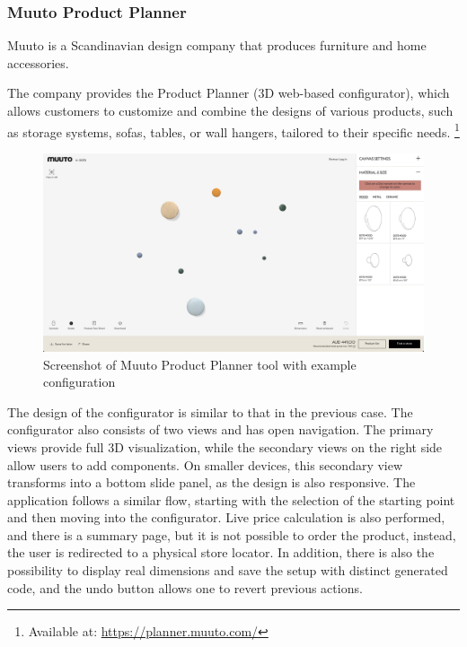 \subsubsection{Muuto Product Planner}

Muuto is a Scandinavian design company that produces furniture and home accessories. \cite{Muuto}

The company provides the Product Planner (3D web-based configurator), which allows customers to customize and combine the designs of various products, such as storage systems, sofas, tables, or wall hangers, tailored to their specific needs. \footnote{Available at: \url{https://planner.muuto.com/}}

\begin{figure}[h]
\centering
\includegraphics[width=\textwidth]{images/analysis_muuto-product-planner.png}
\caption{Screenshot of Muuto Product Planner tool with example configuration}
\end{figure}

The design of the configurator is similar to that in the previous case. The configurator also consists of two views and has open navigation. The primary views provide full 3D visualization, while the secondary views on the right side allow users to add components. On smaller devices, this secondary view transforms into a bottom slide panel, as the design is also responsive. The application follows a similar flow, starting with the selection of the starting point and then moving into the configurator. Live price calculation is also performed, and there is a summary page, but it is not possible to order the product, instead, the user is redirected to a physical store locator. In addition, there is also the possibility to display real dimensions and save the setup with distinct generated code, and the undo button allows one to revert previous actions.

